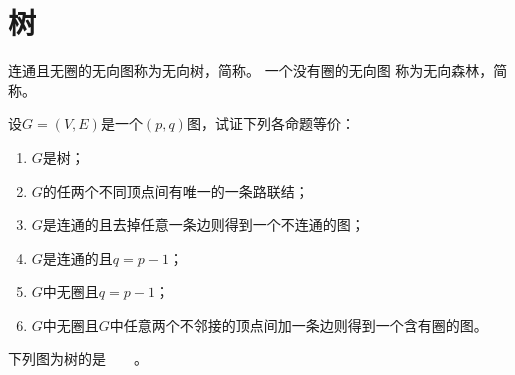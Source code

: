 \chapter{树}
  \begin{Def}
    连通且无圈的无向图称为无向树，简称{}。 一个没有圈的无向图
    称为无向森林，简称{}。
  \end{Def}

  \begin{Ex}
  设$G=(V,E)$是一个$(p,q)$图，试证下列各命题等价：
  \begin{enumerate}
  \item $G$是树；
  \item $G$的任两个不同顶点间有唯一的一条路联结；
  \item $G$是连通的且去掉任意一条边则得到一个不连通的图；
  \item $G$是连通的且$q = p - 1$；
  \item $G$中无圈且$q = p - 1$；
  \item $G$中无圈且$G$中任意两个不邻接的顶点间加一条边则得到一个含有圈的图。
  \end{enumerate}
  \end{Ex}
  \begin{Ex}
  下列图为树的是\underline{$\quad\quad$}。
\end{Ex}

  \vspace{0.5cm}

